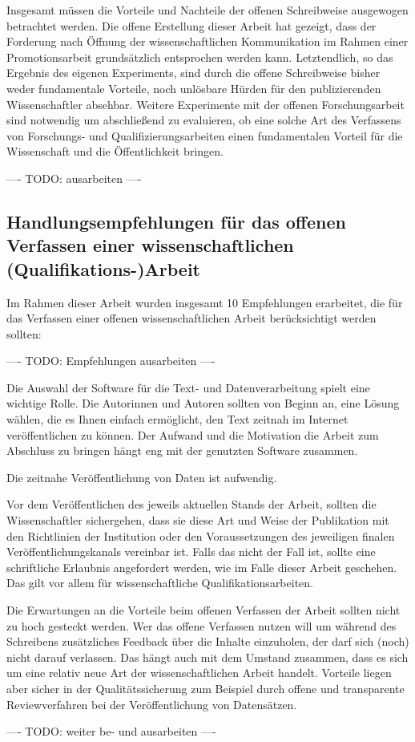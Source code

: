 Insgesamt müssen die Vorteile und Nachteile der offenen Schreibweise ausgewogen betrachtet werden. Die offene Erstellung dieser Arbeit hat gezeigt, dass der Forderung nach Öffnung der wissenschaftlichen Kommunikation im Rahmen einer Promotionsarbeit grundsätzlich entsprochen werden kann. Letztendlich, so das Ergebnis des eigenen Experiments, sind durch die offene Schreibweise bisher weder fundamentale Vorteile, noch unlösbare Hürden für den publizierenden Wissenschaftler absehbar. Weitere Experimente mit der offenen Forschungsarbeit sind notwendig um abschließend zu evaluieren, ob eine solche Art des Verfassens von Forschungs- und Qualifizierungsarbeiten einen fundamentalen Vorteil für die Wissenschaft und die Öffentlichkeit bringen.

---- TODO: ausarbeiten ----

\subsection{Handlungsempfehlungen für das offenen Verfassen einer wissenschaftlichen (Qualifikations-)Arbeit}

Im Rahmen dieser Arbeit wurden insgesamt 10 Empfehlungen erarbeitet, die für das Verfassen einer offenen wissenschaftlichen Arbeit berücksichtigt werden sollten:

---- TODO: Empfehlungen ausarbeiten ----

Die Auswahl der Software für die Text- und Datenverarbeitung spielt eine wichtige Rolle. Die Autorinnen und Autoren sollten von Beginn an, eine Lösung wählen, die es Ihnen einfach ermöglicht, den Text zeitnah im Internet veröffentlichen zu können. Der Aufwand und die Motivation die Arbeit zum Abschluss zu bringen hängt eng mit der genutzten Software zusammen.

Die zeitnahe Veröffentlichung von Daten ist aufwendig.

Vor dem Veröffentlichen des jeweils aktuellen Stands der Arbeit, sollten die Wissenschaftler sichergehen, dass sie diese Art und Weise der Publikation mit den Richtlinien der Institution oder den Voraussetzungen des jeweiligen finalen Veröffentlichungskanals vereinbar ist. Falls das nicht der Fall ist, sollte eine schriftliche Erlaubnis angefordert werden, wie im Falle dieser Arbeit geschehen. Das gilt vor allem für wissenschaftliche Qualifikationsarbeiten.

Die Erwartungen an die Vorteile beim offenen Verfassen der Arbeit sollten nicht zu hoch gesteckt werden. Wer das offene Verfassen nutzen will um während des Schreibens zusätzliches Feedback über die Inhalte einzuholen, der darf sich (noch) nicht darauf verlassen. Das hängt auch mit dem Umstand zusammen, dass es sich um eine relativ neue Art der wissenschaftlichen Arbeit handelt. Vorteile liegen aber sicher in der Qualitätssicherung zum Beispiel durch offene und transparente Reviewverfahren bei der Veröffentlichung von Datensätzen.

---- TODO: weiter be- und ausarbeiten ----
